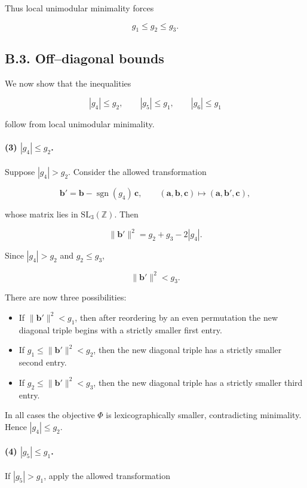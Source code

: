 \documentclass[preprint]{iucr}              %
\numberwithin{equation}{section}
\begin{document}
\medskip

\noindent
Thus local unimodular minimality forces


\[
g_1 \le g_2 \le g_3.
\]



\subsection*{B.3. Off–diagonal bounds}

We now show that the inequalities


\[
|g_4| \le g_2,\qquad |g_5| \le g_1,\qquad |g_6| \le g_1
\]


follow from local unimodular minimality.

\paragraph{(3) $|g_4| \le g_2$.}
Suppose $|g_4| > g_2$.  Consider the allowed transformation


\[
\mathbf{b}' = \mathbf{b} - \operatorname{sgn}(g_4)\,\mathbf{c},
\qquad
(\mathbf{a},\mathbf{b},\mathbf{c}) \mapsto (\mathbf{a},\mathbf{b}',\mathbf{c}),
\]


whose matrix lies in $\mathrm{SL}_3(\mathbb{Z})$.  Then


\[
\|\mathbf{b}'\|^2 = g_2 + g_3 - 2|g_4|.
\]


Since $|g_4| > g_2$ and $g_2 \le g_3$,


\[
\|\mathbf{b}'\|^2 < g_3.
\]



There are now three possibilities:
\begin{itemize}
	\item If $\|\mathbf{b}'\|^2 < g_1$, then after reordering by an even
	permutation the new diagonal triple begins with a strictly
	smaller first entry.
	\item If $g_1 \le \|\mathbf{b}'\|^2 < g_2$, then the new diagonal
	triple has a strictly smaller second entry.
	\item If $g_2 \le \|\mathbf{b}'\|^2 < g_3$, then the new diagonal
	triple has a strictly smaller third entry.
\end{itemize}
In all cases the objective $\Phi$ is lexicographically smaller,
contradicting minimality.  Hence $|g_4| \le g_2$.

\paragraph{(4) $|g_5| \le g_1$.}
If $|g_5| > g_1$, apply the allowed transformation
\end{document}
